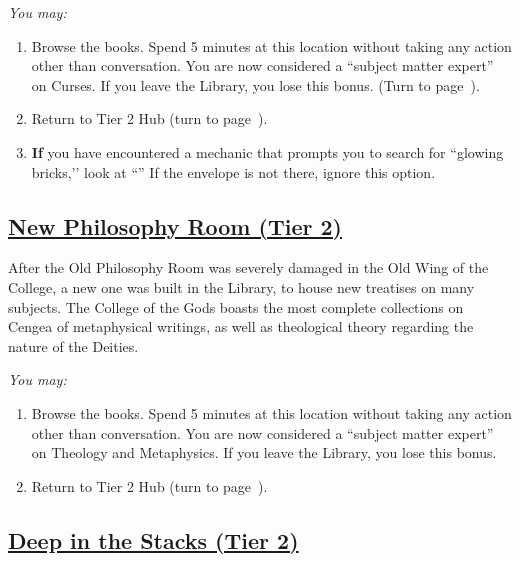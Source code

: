 \documentclass[sheet]{GL2020}
\begin{document}
\vspace{0.5cm}

\begingroup
\itshape
You may:
\begin{enumerate}[A]
  \item Browse the books. Spend 5 minutes at this location without taking any action other than conversation. You are now considered a ``subject matter expert'' on Curses. If you leave the Library, you lose this bonus. (Turn to page~\pageref{BookonGardening}).
	\item Return to Tier 2 Hub (turn to page~\pageref{TierTwoHub}).
	\item \textbf{If} you have encountered a mechanic that prompts you to search for ``glowing bricks,’’ look at ``\sBlueBrickElevenEnvelope{}'' If the envelope is not there, ignore this option.
\end{enumerate}
\endgroup

\clearpage

\begin{center}\section*{\underline{New Philosophy Room (Tier 2)}}\end{center}
\label{NewPhilosophy}

After the Old Philosophy Room was severely damaged in the Old Wing of the College, a new one was built in the Library, to house new treatises on many subjects. The College of the Gods boasts the most complete collections on Cengea of metaphysical writings, as well as theological theory regarding the nature of the Deities. 

\vspace{0.5cm}

\begingroup
\itshape
You may:
\begin{enumerate}[A]
  \item Browse the books. Spend 5 minutes at this location without taking any action other than conversation. You are now considered a ``subject matter expert'' on Theology and Metaphysics. If you leave the Library, you lose this bonus.
	\item Return to Tier 2 Hub (turn to page~\pageref{TierTwoHub}).
\end{enumerate}
\endgroup

\clearpage

\begin{center}\section*{\underline{Deep in the Stacks (Tier 2)}}\end{center}
\label{DeepStacks}
\end{document}
